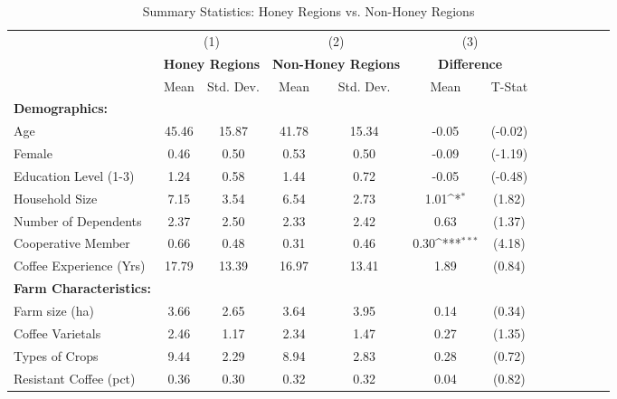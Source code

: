 \begin{table}[htbp]\centering \small
\def\sym#1{\ifmmode^{#1}\else\(^{#1}\)\fi}
\caption{Summary Statistics: Honey Regions vs. Non-Honey Regions \label{summary_region}}
\begin{tabular}{l*{3}{cccc}}
\toprule
                &\multicolumn{2}{c}{(1)}&\multicolumn{2}{c}{(2)}&\multicolumn{2}{c}{(3)}     \\
                &\multicolumn{2}{c}{\textbf{Honey Regions}}&\multicolumn{2}{c}{\textbf{Non-Honey Regions}}&\multicolumn{2}{c}{\textbf{Difference}}\\
                &     Mean&Std. Dev.&     Mean&Std. Dev.&     Mean         &   T-Stat\\
\midrule
\textbf{Demographics:}&         &         &         &         &                  &         \\
\addlinespace
Age             &    45.46&    15.87&    41.78&    15.34&    -0.05         &  (-0.02)\\
\addlinespace
Female          &     0.46&     0.50&     0.53&     0.50&    -0.09         &  (-1.19)\\
\addlinespace
Education Level (1-3)&     1.24&     0.58&     1.44&     0.72&    -0.05         &  (-0.48)\\
\addlinespace
Household Size  &     7.15&     3.54&     6.54&     2.73&     1.01\sym{*}  &   (1.82)\\
\addlinespace
Number of Dependents&     2.37&     2.50&     2.33&     2.42&     0.63         &   (1.37)\\
\addlinespace
Cooperative Member&     0.66&     0.48&     0.31&     0.46&     0.30\sym{***}&   (4.18)\\
\addlinespace
Coffee Experience (Yrs)&    17.79&    13.39&    16.97&    13.41&     1.89         &   (0.84)\\
\addlinespace
\textbf{Farm Characteristics:}&         &         &         &         &                  &         \\
\addlinespace
Farm size (ha)  &     3.66&     2.65&     3.64&     3.95&     0.14         &   (0.34)\\
\addlinespace
Coffee Varietals&     2.46&     1.17&     2.34&     1.47&     0.27         &   (1.35)\\
\addlinespace
Types of Crops  &     9.44&     2.29&     8.94&     2.83&     0.28         &   (0.72)\\
\addlinespace
Resistant Coffee (pct)&     0.36&     0.30&     0.32&     0.32&     0.04         &   (0.82)\\

\end{tabular}
\end{table}
